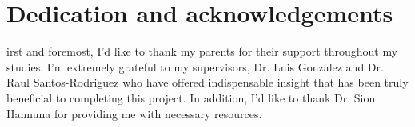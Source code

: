 %
%

\chapter*{Dedication and acknowledgements}
\begin{SingleSpace}
irst and foremost, I'd like to thank my parents for their support throughout my studies. 
I'm extremely grateful to my supervisors, Dr. Luis Gonzalez and Dr. Raul Santos-Rodriguez who have offered indispensable  insight that has been truly beneficial to completing this project. In addition, I'd like to thank Dr. Sion Hannuna for providing me with necessary resources. 
\end{SingleSpace}
\clearpage